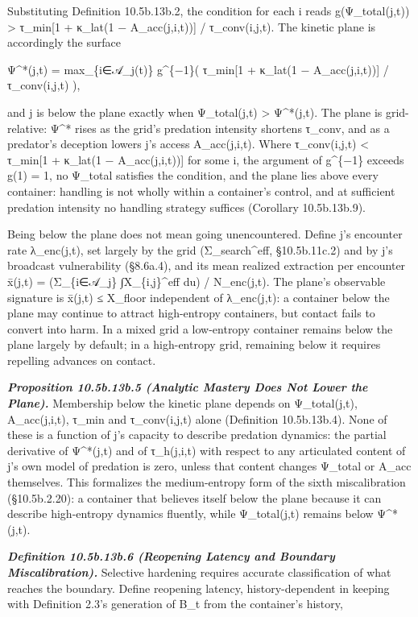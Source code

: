 \documentclass[
]{article}
\begin{document}
Substituting Definition 10.5b.13b.2, the condition for each i reads
g(Ψ\_total(j,t)) \textgreater{} τ\_min{[}1 + κ\_lat(1 −
A\_acc(j,i,t)){]} / τ\_conv(i,j,t). The kinetic plane is accordingly the
surface

Ψ\^{}*(j,t) = max\_\{i∈𝒜\_j(t)\} g\^{}\{−1\}( τ\_min{[}1 + κ\_lat(1 −
A\_acc(j,i,t)){]} / τ\_conv(i,j,t) ),

and j is below the plane exactly when Ψ\_total(j,t) \textgreater{}
Ψ\^{}*(j,t). The plane is grid-relative: Ψ\^{}* rises as the grid's
predation intensity shortens τ\_conv, and as a predator's deception
lowers j's access A\_acc(j,i,t). Where τ\_conv(i,j,t) \textless{}
τ\_min{[}1 + κ\_lat(1 − A\_acc(j,i,t)){]} for some i, the argument of
g\^{}\{−1\} exceeds g(1) = 1, no Ψ\_total satisfies the condition, and
the plane lies above every container: handling is not wholly within a
container's control, and at sufficient predation intensity no handling
strategy suffices (Corollary 10.5b.13b.9).

Being below the plane does not mean going unencountered. Define j's
encounter rate λ\_enc(j,t), set largely by the grid (Σ\_search\^{}eff,
§10.5b.11c.2) and by j's broadcast vulnerability (§8.6a.4), and its mean
realized extraction per encounter x̄(j,t) = (Σ\_\{i∈𝒜\_j\}
∫X\_\{i,j\}\^{}eff du) / N\_enc(j,t). The plane's observable signature
is x̄(j,t) ≤ X\_floor independent of λ\_enc(j,t): a container below the
plane may continue to attract high-entropy containers, but contact fails
to convert into harm. In a mixed grid a low-entropy container remains
below the plane largely by default; in a high-entropy grid, remaining
below it requires repelling advances on contact.

\emph{\textbf{Proposition 10.5b.13b.5 (Analytic Mastery Does Not Lower
the Plane).}} Membership below the kinetic plane depends on
Ψ\_total(j,t), A\_acc(j,i,t), τ\_min and τ\_conv(i,j,t) alone
(Definition 10.5b.13b.4). None of these is a function of j's capacity to
describe predation dynamics: the partial derivative of Ψ\^{}*(j,t) and
of τ\_h(j,i,t) with respect to any articulated content of j's own model
of predation is zero, unless that content changes Ψ\_total or A\_acc
themselves. This formalizes the medium-entropy form of the sixth
miscalibration (§10.5b.2.20): a container that believes itself below the
plane because it can describe high-entropy dynamics fluently, while
Ψ\_total(j,t) remains below Ψ\^{}*(j,t).

\emph{\textbf{Definition 10.5b.13b.6 (Reopening Latency and Boundary
Miscalibration).}} Selective hardening requires accurate classification
of what reaches the boundary. Define reopening latency,
history-dependent in keeping with Definition 2.3's generation of B\_t
from the container's history,
\end{document}
